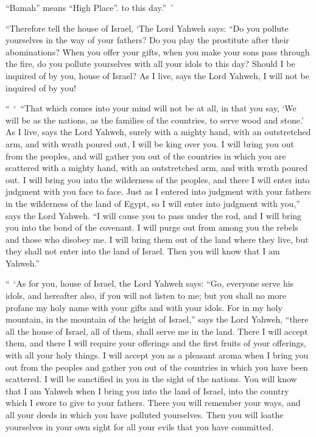 {{“Bamah” means “High Place”.} to this day.” ’
\par }{\PP {}“Therefore tell the house of Israel, ‘The Lord Yahweh says: “Do you pollute yourselves in the way of your fathers? Do you play the prostitute after their abominations?
When you offer your gifts, when you make your sons pass through the fire, do you pollute yourselves with all your idols to this day? Should I be inquired of by you, house of Israel? As I live, says the Lord Yahweh, I will not be inquired of by you!
\par }{\PP {}“ ‘ “That which comes into your mind will not be at all, in that you say, ‘We will be as the nations, as the families of the countries, to serve wood and stone.’
As I live, says the Lord Yahweh, surely with a mighty hand, with an outstretched arm, and with wrath poured out, I will be king over you.
I will bring you out from the peoples, and will gather you out of the countries in which you are scattered with a mighty hand, with an outstretched arm, and with wrath poured out.
I will bring you into the wilderness of the peoples, and there I will enter into judgment with you face to face.
Just as I entered into judgment with your fathers in the wilderness of the land of Egypt, so I will enter into judgment with you,” says the Lord Yahweh.
“I will cause you to pass under the rod, and I will bring you into the bond of the covenant.
I will purge out from among you the rebels and those who disobey me. I will bring them out of the land where they live, but they shall not enter into the land of Israel. Then you will know that I am Yahweh.”
\par }{\PP {}“ ‘As for you, house of Israel, the Lord Yahweh says: “Go, everyone serve his idols, and hereafter also, if you will not listen to me; but you shall no more profane my holy name with your gifts and with your idols.
For in my holy mountain, in the mountain of the height of Israel,” says the Lord Yahweh, “there all the house of Israel, all of them, shall serve me in the land. There I will accept them, and there I will require your offerings and the first fruits of your offerings, with all your holy things.
I will accept you as a pleasant aroma when I bring you out from the peoples and gather you out of the countries in which you have been scattered. I will be sanctified in you in the sight of the nations.
You will know that I am Yahweh when I bring you into the land of Israel, into the country which I swore to give to your fathers.
There you will remember your ways, and all your deeds in which you have polluted yourselves. Then you will loathe yourselves in your own sight for all your evils that you have committed.
}
